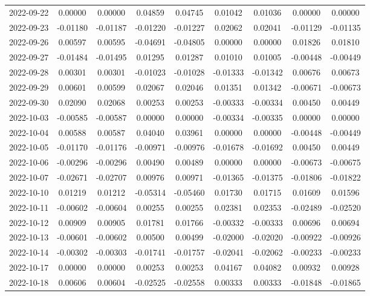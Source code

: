 {\begin{footnotesize}
\begin{longtable}{lcccccccc}
2022-09-22 & 0.00000 & 0.00000 & 0.04859 & 0.04745 & 0.01042 & 0.01036 & 0.00000 & 0.00000 \\
2022-09-23 & -0.01180 & -0.01187 & -0.01220 & -0.01227 & 0.02062 & 0.02041 & -0.01129 & -0.01135 \\
2022-09-26 & 0.00597 & 0.00595 & -0.04691 & -0.04805 & 0.00000 & 0.00000 & 0.01826 & 0.01810 \\
2022-09-27 & -0.01484 & -0.01495 & 0.01295 & 0.01287 & 0.01010 & 0.01005 & -0.00448 & -0.00449 \\
2022-09-28 & 0.00301 & 0.00301 & -0.01023 & -0.01028 & -0.01333 & -0.01342 & 0.00676 & 0.00673 \\
2022-09-29 & 0.00601 & 0.00599 & 0.02067 & 0.02046 & 0.01351 & 0.01342 & -0.00671 & -0.00673 \\
2022-09-30 & 0.02090 & 0.02068 & 0.00253 & 0.00253 & -0.00333 & -0.00334 & 0.00450 & 0.00449 \\
2022-10-03 & -0.00585 & -0.00587 & 0.00000 & 0.00000 & -0.00334 & -0.00335 & 0.00000 & 0.00000 \\
2022-10-04 & 0.00588 & 0.00587 & 0.04040 & 0.03961 & 0.00000 & 0.00000 & -0.00448 & -0.00449 \\
2022-10-05 & -0.01170 & -0.01176 & -0.00971 & -0.00976 & -0.01678 & -0.01692 & 0.00450 & 0.00449 \\
2022-10-06 & -0.00296 & -0.00296 & 0.00490 & 0.00489 & 0.00000 & 0.00000 & -0.00673 & -0.00675 \\
2022-10-07 & -0.02671 & -0.02707 & 0.00976 & 0.00971 & -0.01365 & -0.01375 & -0.01806 & -0.01822 \\
2022-10-10 & 0.01219 & 0.01212 & -0.05314 & -0.05460 & 0.01730 & 0.01715 & 0.01609 & 0.01596 \\
2022-10-11 & -0.00602 & -0.00604 & 0.00255 & 0.00255 & 0.02381 & 0.02353 & -0.02489 & -0.02520 \\
2022-10-12 & 0.00909 & 0.00905 & 0.01781 & 0.01766 & -0.00332 & -0.00333 & 0.00696 & 0.00694 \\
2022-10-13 & -0.00601 & -0.00602 & 0.00500 & 0.00499 & -0.02000 & -0.02020 & -0.00922 & -0.00926 \\
2022-10-14 & -0.00302 & -0.00303 & -0.01741 & -0.01757 & -0.02041 & -0.02062 & -0.00233 & -0.00233 \\
2022-10-17 & 0.00000 & 0.00000 & 0.00253 & 0.00253 & 0.04167 & 0.04082 & 0.00932 & 0.00928 \\
2022-10-18 & 0.00606 & 0.00604 & -0.02525 & -0.02558 & 0.00333 & 0.00333 & -0.01848 & -0.01865 \\

\end{longtable}
\end{footnotesize}}
